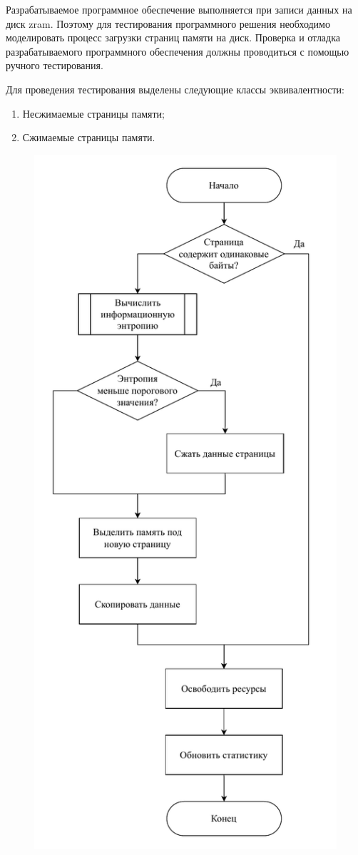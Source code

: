 Разрабатываемое программное обеспечение выполняется при записи данных на диск zram. Поэтому для тестирования программного решения необходимо моделировать процесс загрузки страниц памяти на диск. Проверка и отладка разрабатываемого программного обеспечения должны проводиться с помощью ручного тестирования. 

Для проведения тестирования выделены следующие классы эквивалентности:

\begin{enumerate}
	\item Несжимаемые страницы памяти;
	\item Сжимаемые страницы памяти.
\end{enumerate}

\begin{figure}[H]
	\begin{center}
		\includegraphics[scale=0.7]{inc/img/write-page.pdf}

\end{center}
\end{figure}
